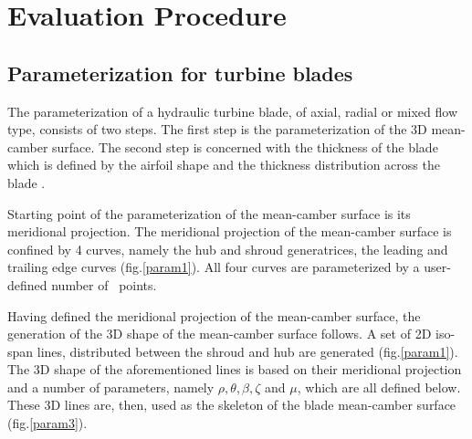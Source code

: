 \section{Evaluation Procedure}
\label{ParamEval}
\subsection{Parameterization for turbine blades}
\label{Paramt}
The  parameterization of a hydraulic turbine blade, of axial, radial or mixed flow type, consists of two steps. The first step is the parameterization of the 3D mean-camber surface. The second step is concerned with the thickness of the blade which is defined by the airfoil shape and the thickness distribution across the blade \cite{dipl_livia,dipl_simon}.

Starting point of the parameterization of the mean-camber surface is its meridional projection. The meridional projection of the mean-camber surface is confined by 4 curves, namely the hub and shroud generatrices, the leading and trailing edge curves (fig.\ref{param1}). All four curves are parameterized by a user-defined number of \Bezier\ points.



Having defined the meridional projection of the mean-camber surface,  the generation of the 3D shape of the mean-camber surface follows. A set of 2D iso-span lines, distributed between the shroud and hub  are generated (fig.\ref{param1}). The 3D shape of the aforementioned lines is  based on their meridional projection and a number of parameters, namely $\rho,\theta,\beta,\zeta$ and $\mu$, which are all defined below. These 3D lines are, then, used as the skeleton of the blade mean-camber surface (fig.\ref{param3}).

